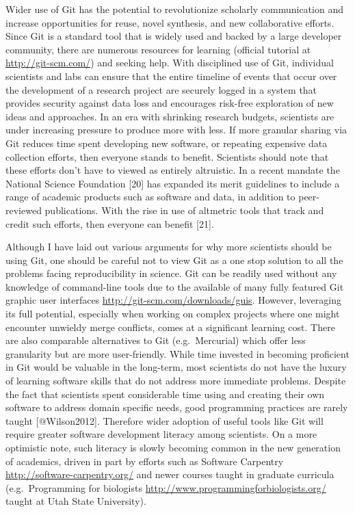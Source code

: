 \documentclass[]{article}
\begin{document}
Wider use of Git has the potential to revolutionize scholarly
communication and increase opportunities for reuse, novel synthesis, and
new collaborative efforts. Since Git is a standard tool that is widely
used and backed by a large developer community, there are numerous
resources for learning (official tutorial at \url{http://git-scm.com/})
and seeking help. With disciplined use of Git, individual scientists and
labs can ensure that the entire timeline of events that occur over the
development of a research project are securely logged in a system that
provides security against data loss and encourages risk-free exploration
of new ideas and approaches. In an era with shrinking research budgets,
scientists are under increasing pressure to produce more with less. If
more granular sharing via Git reduces time spent developing new
software, or repeating expensive data collection efforts, then everyone
stands to benefit. Scientists should note that these efforts don't have
to viewed as entirely altruistic. In a recent mandate the National
Science Foundation {[}20{]} has expanded its merit guidelines to include
a range of academic products such as software and data, in addition to
peer-reviewed publications. With the rise in use of altmetric tools that
track and credit such efforts, then everyone can benefit {[}21{]}.

Although I have laid out various arguments for why more scientists
should be using Git, one should be careful not to view Git as a one stop
solution to all the problems facing reproducibility in science. Git can
be readily used without any knowledge of command-line tools due to the
available of many fully featured Git graphic user interfaces
\url{http://git-scm.com/downloads/guis}. However, leveraging its full
potential, especially when working on complex projects where one might
encounter unwieldy merge conflicts, comes at a significant learning
cost. There are also comparable alternatives to Git (e.g.~Mercurial)
which offer less granularity but are more user-friendly. While time
invested in becoming proficient in Git would be valuable in the
long-term, most scientists do not have the luxury of learning software
skills that do not address more immediate problems. Despite the fact
that scientists spent considerable time using and creating their own
software to address domain specific needs, good programming practices
are rarely taught {[}@Wilson2012{]}. Therefore wider adoption of useful
tools like Git will require greater software development literacy among
scientists. On a more optimistic note, such literacy is slowly becoming
common in the new generation of academics, driven in part by efforts
such as Software Carpentry \url{http://software-carpentry.org/} and
newer courses taught in graduate curricula (e.g.~Programming for
biologists \url{http://www.programmingforbiologists.org/} taught at Utah
State University).
\end{document}
